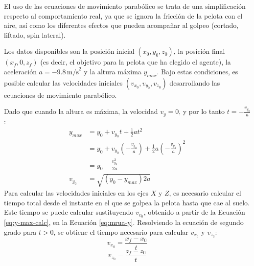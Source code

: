 El uso de las ecuaciones de movimiento parabólico se trata de una simplificación respecto al comportamiento real, ya que se ignora la fricción de la pelota con el aire, así como los diferentes efectos que pueden acompañar al golpeo (cortado, liftado, spin lateral).

Los datos disponibles son la posición inicial $(x_0, y_0, z_0)$, la posición final $(x_f, 0, z_f)$ (es decir, el objetivo para la pelota que ha elegido el agente), la aceleración $a = -9.8 \, \text{m/s}^2$ y la altura máxima $y_{max}$. Bajo estas condiciones, es posible calcular las velocidades iniciales $(v_{x_0}, v_{y_0}, v_{z_0})$ desarrollando las ecuaciones de movimiento parabólico. 

Dado que cuando la altura es máxima, la velocidad $v_y = 0$, y por lo tanto $t = -\frac{v_{y_0}}{a}$:
\begin{equation}
\begin{split}
    y_{max} &= y_0 + v_{y_0} t + \frac{1}{2} a t^2  \\
     &= y_0 + v_{y_0} \left(-\frac{v_{y_0}}{a}\right) + \frac{1}{2} a \left(-\frac{v_{y_0}}{a}\right)^2 \\
     &= y_0 - \frac{v_{y_0}^2}{2a} \\
    v_{y_0} &= \sqrt{(y_0 - y_{max}) 2 a}
\end{split}
\label{eq:y-max-calc}
\end{equation}
Para calcular las velocidades iniciales en los ejes $X$ y $Z$, es necesario calcular el tiempo total desde el instante en el que se golpea la pelota hasta que cae al suelo. Este tiempo se puede calcular sustituyendo $v_{v_0}$, obtenido a partir de la Ecuación \ref{eq:y-max-calc}, en la Ecuación \ref{eq:mrua-y}. Resolviendo la ecuación de segundo grado para $t > 0$, se obtiene el tiempo necesario para calcular $v_{x_0}$ y $v_{z_0}$:
\begin{equation}
    v_{x_0} = \frac{x_f - x_0}{t}
\end{equation}
\begin{equation}
    v_{z_0} = \frac{z_f - z_0}{t}
\end{equation}

